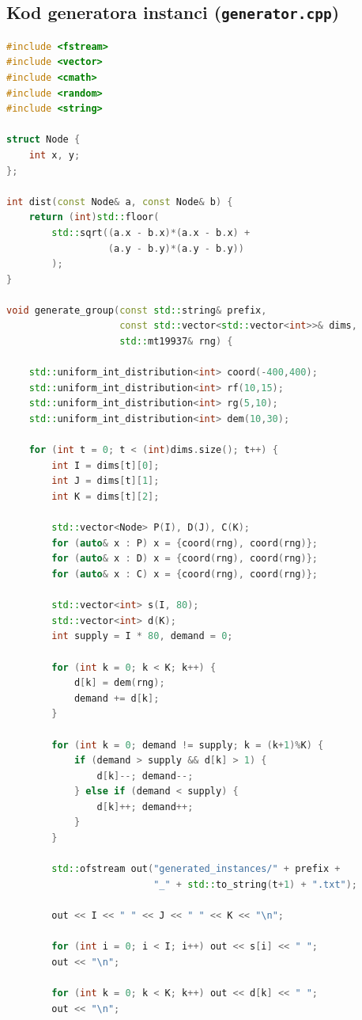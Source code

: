 \documentclass[12pt,a4paper]{article}
\begin{document}
\subsection*{Kod generatora instanci (\texttt{generator.cpp})}
\begin{lstlisting}[language=C++]
#include <fstream>
#include <vector>
#include <cmath>
#include <random>
#include <string>

struct Node {
    int x, y;
};

int dist(const Node& a, const Node& b) {
    return (int)std::floor(
        std::sqrt((a.x - b.x)*(a.x - b.x) +
                  (a.y - b.y)*(a.y - b.y))
        );
}

void generate_group(const std::string& prefix,
                    const std::vector<std::vector<int>>& dims,
                    std::mt19937& rng) {

    std::uniform_int_distribution<int> coord(-400,400);
    std::uniform_int_distribution<int> rf(10,15);
    std::uniform_int_distribution<int> rg(5,10);
    std::uniform_int_distribution<int> dem(10,30);

    for (int t = 0; t < (int)dims.size(); t++) {
        int I = dims[t][0];
        int J = dims[t][1];
        int K = dims[t][2];

        std::vector<Node> P(I), D(J), C(K);
        for (auto& x : P) x = {coord(rng), coord(rng)};
        for (auto& x : D) x = {coord(rng), coord(rng)};
        for (auto& x : C) x = {coord(rng), coord(rng)};

        std::vector<int> s(I, 80);
        std::vector<int> d(K);
        int supply = I * 80, demand = 0;

        for (int k = 0; k < K; k++) {
            d[k] = dem(rng);
            demand += d[k];
        }

        for (int k = 0; demand != supply; k = (k+1)%K) {
            if (demand > supply && d[k] > 1) {
                d[k]--; demand--;
            } else if (demand < supply) {
                d[k]++; demand++;
            }
        }

        std::ofstream out("generated_instances/" + prefix +
                          "_" + std::to_string(t+1) + ".txt");

        out << I << " " << J << " " << K << "\n";

        for (int i = 0; i < I; i++) out << s[i] << " ";
        out << "\n";

        for (int k = 0; k < K; k++) out << d[k] << " ";
        out << "\n";


\end{lstlisting}
\end{document}
